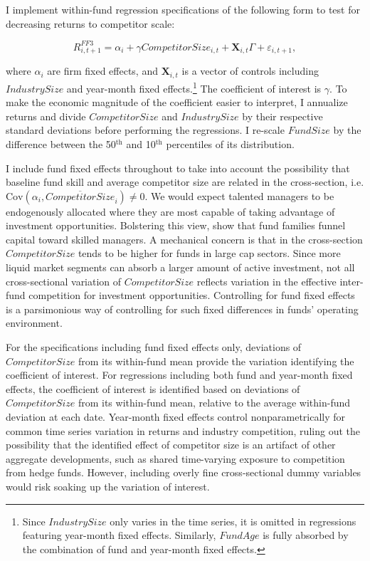 \documentclass[openany]{book}
\let\rmarkdownfootnote\footnote%
\def\footnote{\protect\rmarkdownfootnote}
\theoremstyle{definition}
\theoremstyle{definition}
\theoremstyle{definition}
\theoremstyle{remark}
\begin{document}
I implement within-fund regression specifications of the following form
to test for decreasing returns to competitor scale:

\begin{equation}
R^{FF3}_{i,t+1} = \alpha_i + \gamma CompetitorSize_{i,t} + \mathbf{X}_{i,t}\Gamma + \varepsilon_{i,t+1},
\label{eq:regSpec}
\end{equation}

where \(\alpha_i\) are firm fixed effects, and \(\mathbf{X}_{i,t}\) is a
vector of controls including \(IndustrySize\) and year-month fixed
effects.\footnote{Since \(IndustrySize\) only varies in the time series,
  it is omitted in regressions featuring year-month fixed effects.
  Similarly, \(FundAge\) is fully absorbed by the combination of fund
  and year-month fixed effects.} The coefficient of interest is
\(\gamma\). To make the economic magnitude of the coefficient easier to
interpret, I annualize returns and divide \(CompetitorSize\) and
\(IndustrySize\) by their respective standard deviations before
performing the regressions. I re-scale \(FundSize\) by the difference
between the 50\(^\text{th}\) and 10\(^\text{th}\) percentiles of its
distribution.

I include fund fixed effects throughout to take into account the
possibility that baseline fund skill and average competitor size are
related in the cross-section, i.e.
\(\text{Cov}(\alpha_i, \overline{CompetitorSize}_i)\neq 0\). We would
expect talented managers to be endogenously allocated where they are
most capable of taking advantage of investment opportunities. Bolstering
this view, \citet{bbl17} show that fund families funnel capital toward
skilled managers. A mechanical concern is that in the cross-section
\(CompetitorSize\) tends to be higher for funds in large cap sectors.
Since more liquid market segments can absorb a larger amount of active
investment, not all cross-sectional variation of \(CompetitorSize\)
reflects variation in the effective inter-fund competition for
investment opportunities. Controlling for fund fixed effects is a
parsimonious way of controlling for such fixed differences in funds'
operating environment.

For the specifications including fund fixed effects only, deviations of
\(CompetitorSize\) from its within-fund mean provide the variation
identifying the coefficient of interest. For regressions including both
fund and year-month fixed effects, the coefficient of interest is
identified based on deviations of \(CompetitorSize\) from its
within-fund mean, relative to the average within-fund deviation at each
date. Year-month fixed effects control nonparametrically for common time
series variation in returns and industry competition, ruling out the
possibility that the identified effect of competitor size is an artifact
of other aggregate developments, such as shared time-varying exposure to
competition from hedge funds. However, including overly fine
cross-sectional dummy variables would risk soaking up the variation of
interest.
\end{document}

